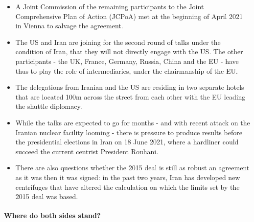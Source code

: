 \begin{itemize}
    \item A Joint Commission of the remaining participants to the Joint
        Comprehensive Plan of Action (JCPoA) met at the beginning of April
        2021 in Vienna to salvage the agreement.
    \item The US and Iran are joining for the second round of talks under the
        condition of Iran, that they will not directly engage with the US. The
        other participants - the UK, France, Germany, Russia, China and the EU
        - have thus to play the role of intermediaries, under the chairmanship
        of the EU.
    \item The delegations from Iranian and the US are residing in two separate
        hotels that are located 100m across the street from each other with the
        EU leading the shuttle diplomacy.
    \item While the talks are expected to go for months - and with recent attack
        on the Iranian nuclear facility looming - there is pressure to produce
        results before the presidential elections in Iran on 18 June 2021, where
        a hardliner could succeed the current centrist President Rouhani.
    \item There are also questions whether the 2015 deal is still as robust an
        agreement as it was then it was signed: in the past two years, Iran has
        developed new centrifuges that have altered the calculation on which
        the limits set by the 2015 deal was based.
\end{itemize}

\paragraph{Where do both sides stand?}


